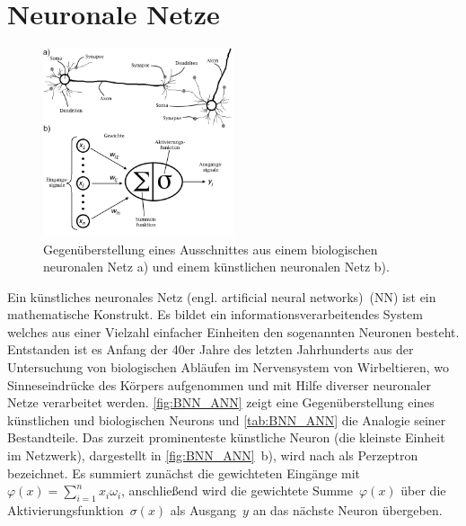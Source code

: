 

\section{Neuronale Netze}
\begin{figure}
    \centering
        \includegraphics[width=0.5\textwidth]{Bilder/BNN_ANN.png}
    \caption{Gegenüberstellung eines Ausschnittes aus einem biologischen neuronalen Netz a)\protect\footnotemark{} und einem künstlichen neuronalen Netz b).}
    \label{fig:BNN_ANN}
\end{figure}

\addtocounter{footnote}{-1}%
\addtocounter{Hfootnote}{-1}%
\wrapfigfoot{}

Ein künstliches neuronales Netz (engl. artificial neural networks)~(NN) ist ein mathematische Konstrukt. Es bildet ein informationsverarbeitendes System welches aus einer Vielzahl einfacher Einheiten den sogenannten Neuronen besteht. Entstanden ist es Anfang der 40er Jahre des letzten Jahrhunderts aus der Untersuchung von biologischen Abläufen im Nervensystem von Wirbeltieren, wo Sinneseindrücke des Körpers aufgenommen und mit Hilfe diverser neuronaler Netze verarbeitet werden. 
\autoref{fig:BNN_ANN} zeigt eine Gegenüberstellung eines künstlichen und biologischen Neurons und \autoref{tab:BNN_ANN} die Analogie seiner Bestandteile. Das zurzeit prominenteste künstliche Neuron (die kleinste Einheit im Netzwerk), dargestellt in \hbox{\autoref{fig:BNN_ANN} b)}, wird nach \citet{perceptron_ros58} als Perzeptron bezeichnet. Es summiert zunächst die gewichteten Eingänge mit $\varphi (x)=\sum_{i=1}^{n}x_{i}\omega_{i}$, anschließend wird die gewichtete Summe~$\varphi(x)$ über die Aktivierungsfunktion~$\sigma(x)$ als Ausgang~$y$ an das nächste Neuron übergeben.%

